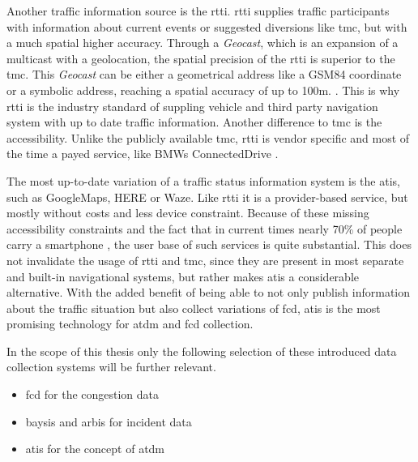 Another traffic information source is the \acrshort{rtti}. \acrshort{rtti} supplies traffic participants with information about current events or suggested diversions like \acrfull{tmc}, but with a much spatial higher accuracy. Through a \textit{Geocast}, which is an expansion of a multicast with a geolocation, the spatial precision of the \acrshort{rtti} is superior to the \acrshort{tmc}. This \textit{Geocast} can be either a geometrical address like a GSM84 coordinate or a symbolic address, reaching a spatial accuracy of up to 100m.  \parencite{LAPID2020,HindenDeering2006,ImielinskiNavas1996}. This is why \acrshort{rtti} is the industry standard of suppling vehicle and third party navigation system with up to date traffic information. Another difference to \acrshort{tmc} is the accessibility. Unlike the publicly available \acrshort{tmc}, \acrshort{rtti} is vendor specific and most of the time a payed service, like BMWs ConnectedDrive \parencite{BMW2020}. 


The most up-to-date variation of a traffic status information system is the \acrfull{atis}, such as GoogleMaps, HERE or Waze. Like \acrshort{rtti} it is a provider-based service, but mostly without costs and less device constraint. Because of these missing accessibility constraints and the fact that in current times nearly 70\% of people carry a smartphone \parencite{IZM2020}, the user base of such services is quite substantial. This does not invalidate the usage of \acrshort{rtti} and \acrshort{tmc}, since they are present in most separate and built-in navigational systems, but rather makes \acrshort{atis} a considerable alternative. With the added benefit of being able to not only publish information about the traffic situation but also collect variations of \acrshort{fcd}, \acrshort{atis} is the most promising technology for \acrshort{atdm} and \acrshort{fcd} collection. 

\bigskip

In the scope of this thesis only the following  selection of these introduced data collection systems will be further relevant. 
\begin{itemize}
  \item \acrshort{fcd} for the congestion data
  \item \acrshort{baysis} and \acrshort{arbis} for incident data
  \item \acrshort{atis} for the concept of \acrshort{atdm}
\end{itemize}



